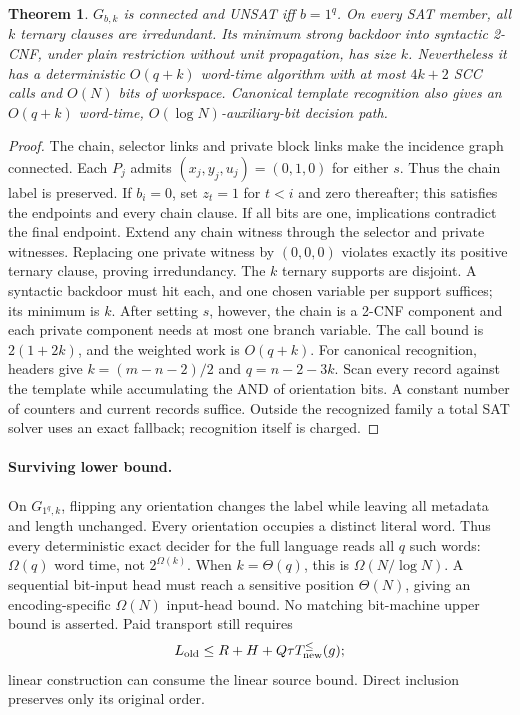 \documentclass[11pt]{article}
\newtheorem{theorem}{Theorem}
\begin{document}
\begin{theorem}
$G_{b,k}$ is connected and UNSAT iff $b=1^q$. On every SAT member, all $k$ ternary clauses are irredundant. Its minimum strong backdoor into syntactic 2-CNF, under plain restriction without unit propagation, has size $k$. Nevertheless it has a deterministic $O(q+k)$ word-time algorithm with at most $4k+2$ SCC calls and $O(N)$ bits of workspace. Canonical template recognition also gives an $O(q+k)$ word-time, $O(\log N)$-auxiliary-bit decision path.
\end{theorem}
\begin{proof}
The chain, selector links and private block links make the incidence graph connected. Each $P_j$ admits $(x_j,y_j,u_j)=(0,1,0)$ for either $s$. Thus the chain label is preserved. If $b_i=0$, set $z_t=1$ for $t<i$ and zero thereafter; this satisfies the endpoints and every chain clause. If all bits are one, implications contradict the final endpoint. Extend any chain witness through the selector and private witnesses. Replacing one private witness by $(0,0,0)$ violates exactly its positive ternary clause, proving irredundancy.
The $k$ ternary supports are disjoint. A syntactic backdoor must hit each, and one chosen variable per support suffices; its minimum is $k$. After setting $s$, however, the chain is a 2-CNF component and each private component needs at most one branch variable. The call bound is $2(1+2k)$, and the weighted work is $O(q+k)$. For canonical recognition, headers give $k=(m-n-2)/2$ and $q=n-2-3k$. Scan every record against the template while accumulating the AND of orientation bits. A constant number of counters and current records suffice. Outside the recognized family a total SAT solver uses an exact fallback; recognition itself is charged.
\end{proof}

\paragraph{Surviving lower bound.}
On $G_{1^q,k}$, flipping any orientation changes the label while leaving all metadata and length unchanged. Every orientation occupies a distinct literal word. Thus every deterministic exact decider for the full language reads all $q$ such words: $\Omega(q)$ word time, not $2^{\Omega(k)}$. When $k=\Theta(q)$, this is $\Omega(N/\log N)$. A sequential bit-input head must reach a sensitive position $\Theta(N)$, giving an encoding-specific $\Omega(N)$ input-head bound. No matching bit-machine upper bound is asserted. Paid transport still requires
\[
L_{\rm old}\le R+H+Q\tau T_{\rm new}^{\le}(g);
\]
linear construction can consume the linear source bound. Direct inclusion preserves only its original order.
\end{document}
